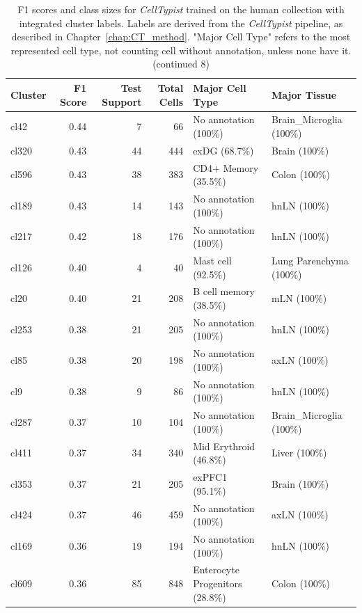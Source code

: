 \begin{table}[ht!]
\scriptsize
\caption[F1 scores and class sizes for \textit{CellTypist} trained on the human collection with integrated cluster labels (continued 8)]{F1 scores and class sizes for \textit{CellTypist} trained on the human collection with integrated cluster labels. Labels are derived from the \textit{CellTypist} pipeline, as described in Chapter~\ref{chap:CT_method}. "Major Cell Type" refers to the most represented cell type, not counting cell without annotation, unless none have it. (continued 8)}
\centering
\label{table:tab_HAmodelclust8}
\begin{tabular}{lrrrll}
  \toprule
Cluster & F1 Score & Test Support & Total Cells & Major Cell Type & Major Tissue \\ 
  \midrule  
  cl42 & 0.44 &   7 &  66 & No annotation (100\%) & Brain\_Microglia (100\%) \\ 
  cl320 & 0.43 &  44 & 444 & exDG (68.7\%) & Brain (100\%) \\ 
  cl596 & 0.43 &  38 & 383 & CD4+ Memory (35.5\%) & Colon (100\%) \\ 
  cl189 & 0.43 &  14 & 143 & No annotation (100\%) & hnLN (100\%) \\ 
  cl217 & 0.42 &  18 & 176 & No annotation (100\%) & hnLN (100\%) \\ 
  cl126 & 0.40 &   4 &  40 & Mast cell (92.5\%) & Lung Parenchyma (100\%) \\ 
  cl20 & 0.40 &  21 & 208 & B cell memory (38.5\%) & mLN (100\%) \\ 
  cl253 & 0.38 &  21 & 205 & No annotation (100\%) & hnLN (100\%) \\ 
  cl85 & 0.38 &  20 & 198 & No annotation (100\%) & axLN (100\%) \\ 
  cl9 & 0.38 &   9 &  86 & No annotation (100\%) & hnLN (100\%) \\ 
  cl287 & 0.37 &  10 & 104 & No annotation (100\%) & Brain\_Microglia (100\%) \\ 
  cl411 & 0.37 &  34 & 340 & Mid Erythroid (46.8\%) & Liver (100\%) \\ 
  cl353 & 0.37 &  21 & 205 & exPFC1 (95.1\%) & Brain (100\%) \\ 
  cl424 & 0.37 &  46 & 459 & No annotation (100\%) & axLN (100\%) \\ 
  cl169 & 0.36 &  19 & 194 & No annotation (100\%) & hnLN (100\%) \\ 
  cl609 & 0.36 &  85 & 848 & Enterocyte Progenitors (28.8\%) & Colon (100\%) \\ 

\end{tabular}
\end{table}
